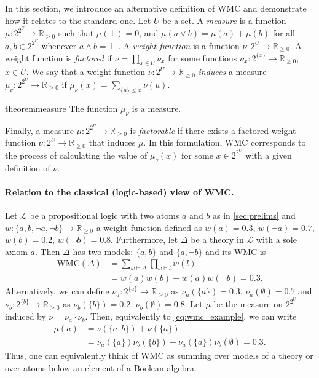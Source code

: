 \documentclass{uai2021} %
\theoremstyle{definition}
\begin{document}
In this section, we introduce an alternative definition of WMC and demonstrate
how it relates to the standard one. Let $U$ be a set. A \emph{measure} is a
function $\mu\colon 2^{2^U} \to \mathbb{R}_{\ge 0}$ such that $\mu(\bot) = 0$,
and $\mu(a \lor b) = \mu(a) + \mu(b)$ for all $a, b \in 2^{2^U}$ whenever $a
\land b = \bot$ \citep{gaifman1964concerning,DBLP:books/daglib/0090259}. A
\emph{weight function} is a function $\nu\colon 2^U \to \mathbb{R}_{\ge 0}$. A
weight function is \emph{factored} if $\nu = \prod_{x \in U} \nu_x$ for some
functions $\nu_x\colon 2^{\{x\}} \to \mathbb{R}_{\ge 0}$, $x \in U$. We say that
a weight function $\nu\colon 2^U \to \mathbb{R}_{\ge 0}$ \emph{induces} a
measure $\mu_\nu\colon 2^{2^U} \to \mathbb{R}_{\ge 0}$ if $\mu_\nu(x) =
\sum_{\{u\} \le x} \nu(u)$.

\begin{restatable}{theorem}{measure} \label{prop:measure}
  The function $\mu_\nu$ is a measure.
\end{restatable}

Finally, a measure $\mu\colon 2^{2^U} \to \mathbb{R}_{\ge 0}$ is
\emph{factorable} if there exists a factored weight function $\nu\colon 2^U \to
\mathbb{R}_{\ge 0}$ that induces $\mu$. In this formulation, WMC corresponds to
the process of calculating the value of $\mu_\nu(x)$ for some $x \in 2^{2^U}$
with a given definition of $\nu$.

\paragraph{Relation to the classical (logic-based) view of WMC.} Let
$\mathcal{L}$ be a propositional logic with two atoms $a$ and $b$ as in
\cref{sec:prelims} and $w\colon \{ a, b, \neg a, \neg b \} \to \mathbb{R}_{\ge
  0}$ a weight function defined as $w(a) = 0.3$, $w(\neg a) = 0.7$, $w(b)
= 0.2$, $w(\neg b) = 0.8$. Furthermore, let $\Delta$ be a theory in
$\mathcal{L}$ with a sole axiom $a$. Then $\Delta$ has two models: $\{ a, b \}$
and $\{ a, \neg b \}$ and its WMC \citep{DBLP:journals/ai/ChaviraD08} is
\begin{equation} \label{eq:wmc_example}
  \begin{split}
    \mathrm{WMC}(\Delta) &= \sum_{\omega \models \Delta} \prod_{\omega \models l} w(l) \\
    &= w(a)w(b) + w(a)w(\neg b) = 0.3.
  \end{split}
\end{equation}
Alternatively, we can define $\nu_a\colon 2^{\{a\}} \to \mathbb{R}_{\ge 0}$ as
$\nu_a(\{ a \}) = 0.3$, $\nu_a(\emptyset) = 0.7$ and $\nu_b\colon 2^{\{b\}} \to
\mathbb{R}_{\ge 0}$ as $\nu_b(\{ b \}) = 0.2$, $\nu_b(\emptyset) = 0.8$. Let
$\mu$ be the measure on $2^{2^U}$ induced by $\nu = \nu_a \cdot \nu_b$. Then,
equivalently to \cref{eq:wmc_example}, we can write
\begin{align*}
  \mu(a) &= \nu(\{ a, b \}) + \nu(\{ a \}) \\
         &= \nu_a(\{a\})\nu_b(\{b\}) + \nu_a(\{a\})\nu_b(\emptyset) = 0.3.
\end{align*}
Thus, one can equivalently think of WMC as summing over models of a theory or
over atoms below an element of a Boolean algebra.
\end{document}
